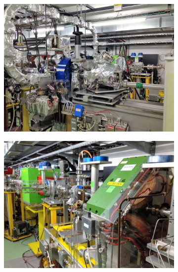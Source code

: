 \begin{figure}[tph]
\begin{subfigure}{0.47\linewidth}
		\includegraphics[width=\linewidth]{images/CLIC-CTF3-img1}
    \end{subfigure}        
	\hfill
    \begin{subfigure}{0.47\linewidth}
		\centering
		\includegraphics[width=\linewidth]{images/CLIC-CTF3-img2}
    \end{subfigure}
	\par\bigskip
    \begin{subfigure}{0.47\linewidth}
		\centering

\end{subfigure}
\end{figure}
